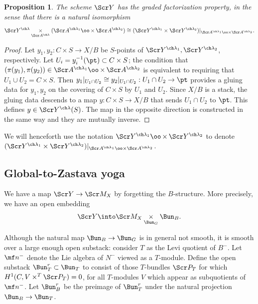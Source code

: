 \documentclass[final]{amsart}
\newtheorem{prop}[subsubsection]{Proposition}
\theoremstyle{remark}
\theoremstyle{definition}
\DeclareMathOperator*{\xt}{\times}
\numberwithin{equation}{section}
\begin{document}
\begin{prop} \label{prop:factorization}
The scheme $\Scr Y$ has the graded factorization property, in the sense
that there is a natural isomorphism 
\[ 
\Scr Y^{\ch\lambda}  \underset{\Scr A^{\ch\lambda}}\times 
(\Scr A^{\ch\lambda_1} \oo\xt \Scr A^{\ch\lambda_2})
\cong 
(\Scr Y^{\ch\lambda_1} \times \Scr Y^{\ch\lambda_2})|_{\Scr A^{\ch\lambda_1}\oo\times \Scr A^{\ch\lambda_2}}. 
\]
\end{prop}
\begin{proof}
Let $y_1, y_2 : C \times S \to X/B$ be $S$-points of $\Scr Y^{\ch\lambda_1}, \Scr Y^{\ch\lambda_2}$, respectively. 
Let $U_i = y_i^{-1}(\pt)\subset C\times S$; the condition that $(\pi(y_1),\pi(y_2))\in
\Scr A^{\ch\lambda_1} \oo\xt \Scr A^{\ch\lambda_2}$ is equivalent to 
requiring that $U_1 \cup U_2 = C\times S$. 
Then 
$y_1|_{U_1\cap U_2} \cong y_2|_{U_1\cap U_2} : U_1\cap U_2 \to \pt$
provides a gluing 
data for $y_1,y_2$ on the covering of $C\times S$ by $U_1$ and $U_2$.
Since $X/B$ is a stack, the gluing data descends to a map
$y : C\times S \to X/B$ that sends $U_1\cap U_2$ to $\pt$. 
This defines $y\in \Scr Y^{\ch\lambda}(S)$. 
The map in the opposite direction
is constructed in the same way and they are mutually inverse.
\end{proof}

We will henceforth use the notation 
$\Scr Y^{\ch\lambda_1} \oo\xt \Scr Y^{\ch\lambda_2}$ to denote
$(\Scr Y^{\ch\lambda_1} \times \Scr Y^{\ch\lambda_2})|_{\Scr A^{\ch\lambda_1}\oo\times \Scr A^{\ch\lambda_2}}$. 

\subsection{Global-to-Zastava yoga} 

We have a map $\Scr Y \to \Scr M_{X}$ by forgetting the $B$-structure. 
More precisely, we have an open embedding 
\begin{equation}
    \Scr Y \into \Scr M_{X} \underset{\Bun_G}\times \Bun_B.
\end{equation}

Although the natural map $\Bun_B \to \Bun_G$ is in general not smooth, 
it is smooth over a large enough open substack: 
consider $T$ as the Levi quotient of $B^-$. Let $\mf n^-$ denote the Lie algebra of $N^-$
viewed as a $T$-module. Define the open substack $\Bun^r_T \subset \Bun_T$ to consist
of those $T$-bundles $\Scr P_T$ for which 
$H^1(C, V \times^T \Scr P_T)=0$, for all $T$-modules $V$ which appear as
subquotients of $\mf n^-$. Let 
$\Bun_B^r$ be the preimage of $\Bun^r_T$ under the natural projection 
$\Bun_B \to \Bun_T$.
\end{document}
